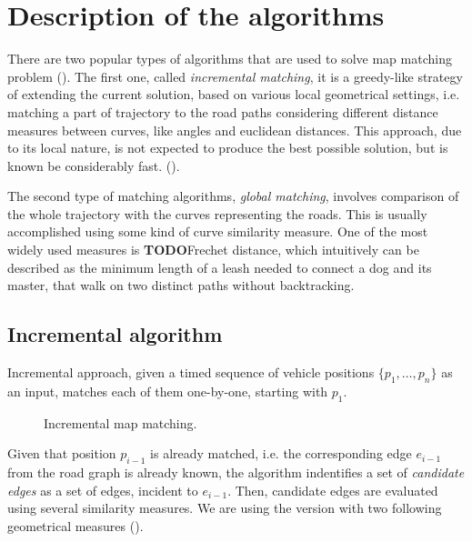 \documentclass[a4paper,twoside,11pt]{article}
\newcommand{\todo}{\textbf{TODO}}
\theoremstyle{plain}
\theoremstyle{definition}  %
\begin{document}
\section{Description of the algorithms}
\label{sec:algorithms}

There are two popular types of algorithms that are used to solve map matching problem
(\cite{Brakatsoulas:2005}).
The first one, called \textit{incremental matching}, it is a greedy-like strategy of extending
the current solution, based on various local geometrical settings, i.e. matching a part
of trajectory to the road paths considering different distance measures between curves, like
angles and euclidean distances. This approach, due to its local nature, is not expected
to produce the best possible solution, but is known be considerably fast.
(\cite{Lowsampling:2009}). %

The second type of matching algorithms, \textit{global matching}, involves comparison
of the whole trajectory with the curves representing the roads. This is usually accomplished
using some kind of curve similarity measure. One of the most widely used measures is \todo{Frechet distance},
which intuitively can be described as the minimum length of a leash needed to connect
a dog and its master, that walk on two distinct paths without backtracking.


\subsection{Incremental algorithm}
\label{sec:algorithms:incremental}
Incremental approach, given a timed sequence of vehicle positions $\{p_1,\ldots,p_n\}$
as an input, matches each of them one-by-one, starting with $p_1$.


\begin{figure}[ht!]
\label{fi:incremental:example}
\caption{Incremental map matching.}
\end{figure}

Given that position $p_{i-1}$ is already matched, i.e. the corresponding edge $e_{i-1}$
from the road graph is already known, the algorithm indentifies a set of
\textit{candidate edges} as a set of edges, incident to $e_{i-1}$. Then,
candidate edges are evaluated using several similarity measures.
We are using the version with two following geometrical measures (\cite{Brakatsoulas:2005}).
\end{document}
